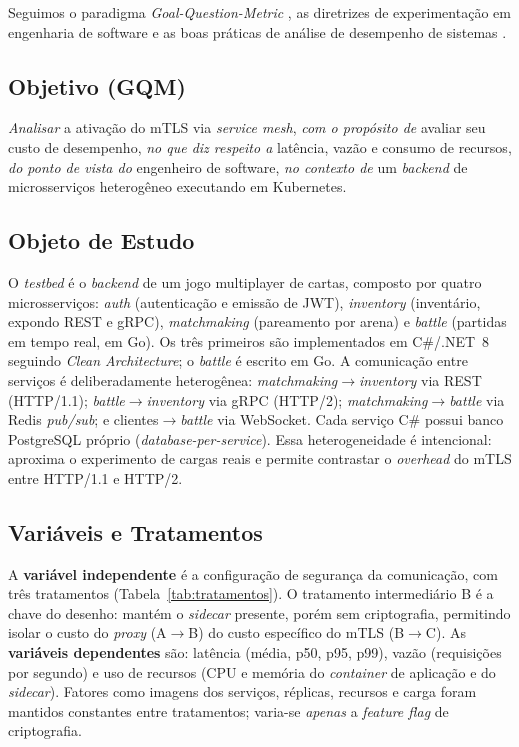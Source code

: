 \documentclass[12pt]{article}
\begin{document}
Seguimos o paradigma \textit{Goal-Question-Metric} \cite{basili1994}, as diretrizes de experimenta\c{c}\~ao em engenharia de software \cite{wohlin2012} e as boas pr\'aticas de an\'alise de desempenho de sistemas \cite{jain1991}.

\subsection{Objetivo (GQM)}
\emph{Analisar} a ativa\c{c}\~ao do mTLS via \textit{service mesh}, \emph{com o prop\'osito de} avaliar seu custo de desempenho, \emph{no que diz respeito a} lat\^encia, vaz\~ao e consumo de recursos, \emph{do ponto de vista do} engenheiro de software, \emph{no contexto de} um \textit{backend} de microsservi\c{c}os heterog\^eneo executando em Kubernetes.

\subsection{Objeto de Estudo}
O \textit{testbed} \'e o \textit{backend} de um jogo multiplayer de cartas, composto por quatro microsservi\c{c}os: \textit{auth} (autentica\c{c}\~ao e emiss\~ao de JWT), \textit{inventory} (invent\'ario, expondo REST e gRPC), \textit{matchmaking} (pareamento por arena) e \textit{battle} (partidas em tempo real, em Go). Os tr\^es primeiros s\~ao implementados em C\#/.NET~8 seguindo \textit{Clean Architecture}; o \textit{battle} \'e escrito em Go. A comunica\c{c}\~ao entre servi\c{c}os \'e deliberadamente heterog\^enea: \textit{matchmaking}$\rightarrow$\textit{inventory} via REST (HTTP/1.1); \textit{battle}$\rightarrow$\textit{inventory} via gRPC (HTTP/2); \textit{matchmaking}$\rightarrow$\textit{battle} via Redis \textit{pub/sub}; e clientes$\rightarrow$\textit{battle} via WebSocket. Cada servi\c{c}o C\# possui banco PostgreSQL pr\'oprio (\textit{database-per-service}). Essa heterogeneidade \'e intencional: aproxima o experimento de cargas reais e permite contrastar o \textit{overhead} do mTLS entre HTTP/1.1 e HTTP/2.

\subsection{Vari\'aveis e Tratamentos}
A \textbf{vari\'avel independente} \'e a configura\c{c}\~ao de seguran\c{c}a da comunica\c{c}\~ao, com tr\^es tratamentos (Tabela~\ref{tab:tratamentos}). O tratamento intermedi\'ario B \'e a chave do desenho: mant\'em o \textit{sidecar} presente, por\'em sem criptografia, permitindo isolar o custo do \textit{proxy} (A$\rightarrow$B) do custo espec\'ifico do mTLS (B$\rightarrow$C). As \textbf{vari\'aveis dependentes} s\~ao: lat\^encia (m\'edia, p50, p95, p99), vaz\~ao (requisi\c{c}\~oes por segundo) e uso de recursos (CPU e mem\'oria do \textit{container} de aplica\c{c}\~ao e do \textit{sidecar}). Fatores como imagens dos servi\c{c}os, r\'eplicas, recursos e carga foram mantidos constantes entre tratamentos; varia-se \emph{apenas} a \textit{feature flag} de criptografia.
\end{document}
